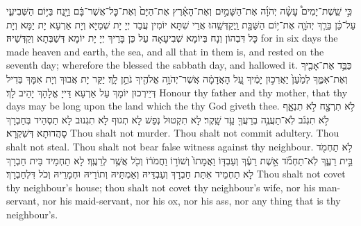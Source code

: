 {כִּ֣י שֵֽׁשֶׁת־יָמִים֩ עָשָׂ֨ה יְהֹוָ֜ה אֶת־הַשָּׁמַ֣יִם וְאֶת־הָאָ֗רֶץ אֶת־הַיָּם֙ וְאֶת־כׇּל־אֲשֶׁר־בָּ֔ם וַיָּ֖נַח בַּיּ֣וֹם הַשְּׁבִיעִ֑י עַל־כֵּ֗ן בֵּרַ֧ךְ יְהֹוָ֛ה אֶת־י֥וֹם הַשַּׁבָּ֖ת וַֽיְקַדְּשֵֽׁהוּ׃\setuma}
{אֲרֵי שִׁתָּא יוֹמִין עֲבַד יְיָ יָת שְׁמַיָּא וְיָת אַרְעָא יָת יַמָּא וְיָת כָּל דִּבְהוֹן וְנָח בְּיוֹמָא שְׁבִיעָאָה עַל כֵּן בָּרֵיךְ יְיָ יָת יוֹמָא דְּשַׁבְּתָא וְקַדְּשֵׁיהּ׃}
{for in six days the \lord\space made heaven and earth, the sea, and all that in them is, and rested on the seventh day; wherefore the \lord\space blessed the sabbath day, and hallowed it.}{}
{כַּבֵּ֥ד אֶת־אָבִ֖יךָ וְאֶת־אִמֶּ֑ךָ לְמַ֙עַן֙ יַאֲרִכ֣וּן יָמֶ֔יךָ עַ֚ל הָאֲדָמָ֔ה אֲשֶׁר־יְהֹוָ֥ה אֱלֹהֶ֖יךָ נֹתֵ֥ן לָֽךְ׃\setuma}
{יַקַּר יָת אֲבוּךְ וְיָת אִמָּךְ בְּדִיל דְּיֵירְכוּן יוֹמָךְ עַל אַרְעָא דַּייָ אֱלָהָךְ יָהֵיב לָךְ׃}
{Honour thy father and thy mother, that thy days may be long upon the land which the \lord\space thy God giveth thee.}{}
{לֹ֥א תִרְצָ֖ח \setuma לֹ֣א תִנְאָ֑ף \setuma לֹ֣א תִגְנֹ֔ב לֹֽא־תַעֲנֶ֥ה בְרֵעֲךָ֖ עֵ֥ד שָֽׁקֶר׃ \setuma}
{לָא תִקְטוּל נְפַשׁ לָא תְגוּף לָא תִגְנוּב לָא תַסְהֵיד בְּחַבְרָךְ סָהֲדוּתָא דְּשִׁקְרָא׃}
{Thou shalt not murder. Thou shalt not commit adultery. Thou shalt not steal. Thou shalt not bear false witness against thy neighbour.}{}
{לֹ֥א תַחְמֹ֖ד בֵּ֣ית רֵעֶ֑ךָ לֹֽא־תַחְמֹ֞ד אֵ֣שֶׁת רֵעֶ֗ךָ וְעַבְדּ֤וֹ וַאֲמָתוֹ֙ וְשׁוֹר֣וֹ וַחֲמֹר֔וֹ וְכֹ֖ל אֲשֶׁ֥ר לְרֵעֶֽךָ׃\petucha}
{לָא תַחְמֵיד בֵּית חַבְרָךְ לָא תַחְמֵיד אִתַּת חַבְרָךְ וְעַבְדֵּיהּ וְאַמְתֵּיהּ וְתוֹרֵיהּ וּחְמָרֵיהּ וְכֹל דִּלְחַבְרָךְ׃}
{Thou shalt not covet thy neighbour’s house; thou shalt not covet thy neighbour’s wife, nor his man-servant, nor his maid-servant, nor his ox, nor his ass, nor any thing that is thy neighbour’s.}{}
